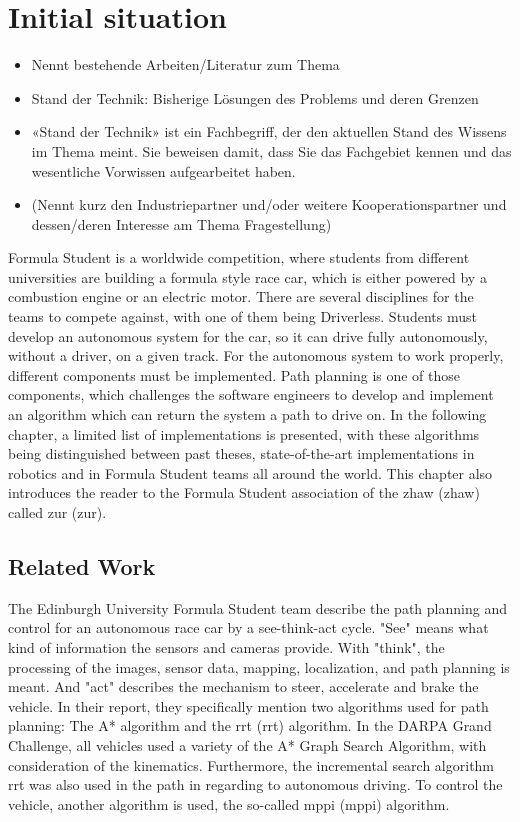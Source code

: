 \section{Initial situation} \label{sec:Initial situation}
\begin{itemize}
    \item Nennt bestehende Arbeiten/Literatur zum Thema
    \item Stand der Technik: Bisherige Lösungen des Problems und deren Grenzen
    \item «Stand der Technik» ist ein Fachbegriff, der den aktuellen Stand des Wissens im Thema meint. Sie beweisen damit, dass Sie das Fachgebiet kennen und das wesentliche Vorwissen aufgearbeitet haben.
    \item (Nennt kurz den Industriepartner und/oder weitere Kooperationspartner und dessen/deren Interesse am Thema Fragestellung)
\end{itemize}
Formula Student is a worldwide competition, where students from different universities are building a formula style race car, which is either powered by a combustion engine or an electric motor. There are several disciplines for the teams to compete against, with one of them being Driverless. Students must develop an autonomous system for the car, so it can drive fully autonomously, without a driver, on a given track. For the autonomous system to work properly, different components must be implemented. Path planning is one of those components, which challenges the software engineers to develop and implement an algorithm which can return the system a path to drive on. In the following chapter, a limited list of implementations is presented, with these algorithms being distinguished between past theses, state-of-the-art implementations in robotics and in Formula Student teams all around the world. This chapter also introduces the reader to the Formula Student association of the \acrlong{zhaw} (\acrshort{zhaw}) called \acrlong{zur} (\acrshort{zur}).

\subsection{Related Work} \label{sec:Related Work}
The Edinburgh University Formula Student team describe the path planning and control for an autonomous race car by a see-think-act cycle. "See" means what kind of information the sensors and cameras provide. With "think", the processing of the images, sensor data, mapping, localization, and path planning is meant. And "act" describes the mechanism to steer, accelerate and brake the vehicle.
In their report, they specifically mention two algorithms used for path planning: The A* algorithm and the \acrlong{rrt} (\acrshort{rrt}) algorithm. In the DARPA Grand Challenge, all vehicles used a variety of the A* Graph Search Algorithm, with consideration of the kinematics. Furthermore, the incremental search algorithm \acrshort{rrt} was also used in the path in regarding to autonomous driving.
To control the vehicle, another algorithm is used, the so-called \acrlong{mppi} (\acrshort{mppi}) algorithm.
\cite{path_planning_and_control_georgiev} \cite{darpa_grand_challenge} %


